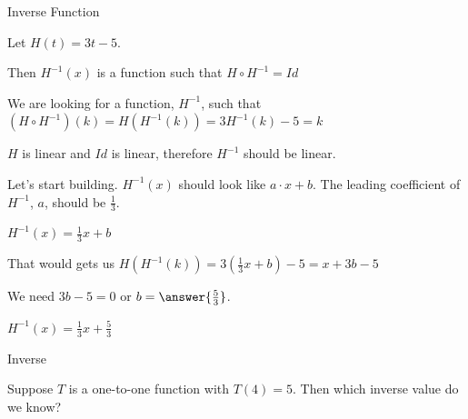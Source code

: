 \documentclass{ximera}
\begin{document}
\begin{example} Inverse Function


Let $H(t) = 3t - 5$. 

Then $H^{-1}(x)$ is a function such that $H \circ H^{-1} = Id$ 


We are looking for a function, $H^{-1}$, such that $(H \circ H^{-1})(k) = H(H^{-1}(k)) = 3 H^{-1}(k) - 5 = k$ 



$H$ is linear and $Id$ is linear, therefore $H^{-1}$ should be linear.

Let's start building.  $H^{-1}(x)$ should look like $a \cdot x + b$.  The leading coefficient of $H^{-1}$, $a$, should be $\frac{1}{3}$.


$H^{-1}(x) =\frac{1}{3} x + b$


That would gets us $H(H^{-1}(k)) = 3 (\frac{1}{3}x + b) - 5 = x + 3b - 5 $


We need $3b - 5 = 0$ or $b = \answer{\frac{5}{3}}$.


$H^{-1}(x) =\frac{1}{3} x + \frac{5}{3}$



\end{example}




\begin{question} Inverse


Suppose $T$ is a one-to-one function with $T(4) = 5$. Then which inverse value do we know?


\begin{multipleChoice}
\end{multipleChoice}

\end{question}
\end{document}
